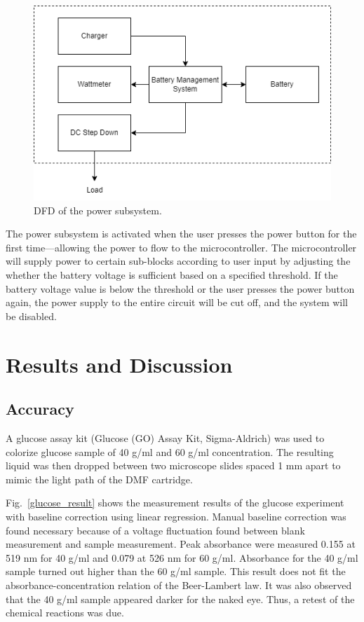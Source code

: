 \documentclass[conference]{IEEEtran}
\begin{document}
\begin{figure}[htbp]
    \centerline{\includegraphics[scale=0.5]{power-dfd.png}}
    \caption{DFD of the power subsystem.}
    \label{power-dfd}
    \end{figure}

The power subsystem is activated when the user presses the power button for the first time—allowing the power to flow to the microcontroller. The microcontroller will supply power to certain sub-blocks according to user input by adjusting the whether the battery voltage is sufficient based on a specified threshold. If the battery voltage value is below the threshold or the user presses the power button again, the power supply to the entire circuit will be cut off, and the system will be disabled.


\section{Results and Discussion}
\subsection{Accuracy}
A glucose assay kit (Glucose (GO) Assay Kit, Sigma-Aldrich) was used to colorize glucose sample of 40 {\textmu}g/ml and 60 {\textmu}g/ml concentration.
The resulting liquid was then dropped between two microscope slides spaced 1 mm apart to mimic the light path of the DMF cartridge.

Fig.~\ref{glucose_result} shows the measurement results of the glucose experiment with baseline correction using linear regression.
Manual baseline correction was found necessary because of a voltage fluctuation found between blank measurement and sample measurement.
Peak absorbance were measured 0.155 at 519 nm for 40 {\textmu}g/ml and 0.079 at 526 nm for 60 {\textmu}g/ml.
Absorbance for the 40 {\textmu}g/ml sample turned out higher than the 60 {\textmu}g/ml sample.
This result does not fit the absorbance-concentration relation of the Beer-Lambert law.
It was also observed that the 40 {\textmu}g/ml sample appeared darker for the naked eye.
Thus, a retest of the chemical reactions was due.
\end{document}
